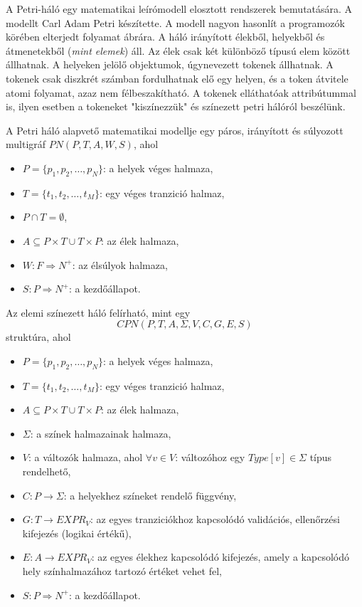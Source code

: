 

A Petri-háló egy matematikai leírómodell elosztott rendszerek bemutatására.
A modellt Carl Adam Petri készítette.
A modell nagyon hasonlít a programozók körében elterjedt folyamat ábrára.
A háló irányított élekből, helyekből és átmenetekből (\textsl{mint elemek}) áll.
Az élek csak két különböző típusú elem között állhatnak.
A helyeken jelölő objektumok, úgynevezett tokenek állhatnak.
A tokenek csak diszkrét számban fordulhatnak elő egy helyen, és a token átvitele atomi folyamat, azaz nem félbeszakítható.
A tokenek elláthatóak attribútummal is, ilyen esetben a tokeneket "kiszínezzük" és színezett petri hálóról beszélünk. %

A Petri háló alapvető matematikai modellje egy páros, irányított és súlyozott multigráf $PN(P,T,A,W,S)$, ahol 
\begin{itemize}
\item $P=\{ p_1,p_2,\ldots ,p_N \}$: a helyek véges halmaza,
\item $T=\{ t_1,t_2,\ldots ,t_M\}$: egy véges tranzició halmaz,
\item $P\cap T = \emptyset$,
\item $A \subseteq P\times T \cup T\times P$: az élek halmaza,
\item $W: F\Rightarrow N^+$: az élsúlyok halmaza,
\item $S: P\Rightarrow N^+$: a kezdőállapot.
\end{itemize}


Az elemi színezett háló felírható, mint egy
\[
CPN(P, T, A, \Sigma, V, C, G, E, S)
\]
struktúra, ahol 
\begin{itemize}
\item $P=\{ p_1, p_2, \ldots, p_N \}$: a helyek véges halmaza,
\item $T=\{ t_1, t_2, \ldots, t_M\}$: egy véges tranzició halmaz,
\item $A \subseteq P\times T \cup T \times P$: az élek halmaza,
\item $\Sigma$: a színek halmazainak halmaza, 
\item $V$: a változók halmaza, ahol $\forall v\in V$: változóhoz egy $Type[v] \in \Sigma $ típus rendelhető,
\item $C: P\rightarrow \Sigma$: a helyekhez színeket rendelő függvény,
\item $G: T\rightarrow EXPR_V$: az egyes tranziciókhoz kapcsolódó validációs, ellenőrzési kifejezés (logikai értékű),
\item $E: A\rightarrow EXPR_V$: az egyes élekhez kapcsolódó kifejezés, amely a kapcsolódó hely színhalmazához tartozó értéket vehet fel,
\item $S: P\Rightarrow N^+$: a kezdőállapot.
\end{itemize}

